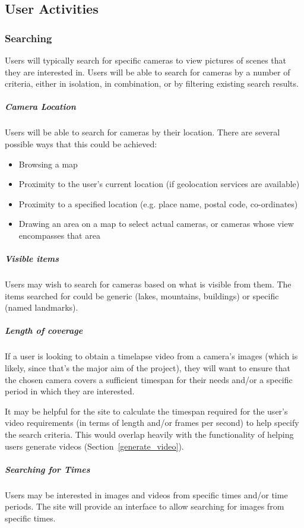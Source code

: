 \documentclass[11pt]{article}
\begin{document}
\subsection{User Activities}
\subsubsection{Searching}
Users will typically search for specific cameras to view pictures of scenes that they are interested in. Users will be able to search for cameras by a number of criteria, either in isolation, in combination, or by filtering existing search results.

\subparagraph{Camera Location}
Users will be able to search for cameras by their location. There are several possible ways that this could be achieved:

\begin{itemize}
\item Browsing a map
\item Proximity to the user's current location (if geolocation services are available)
\item Proximity to a specified location (e.g. place name, postal code, co-ordinates)
\item Drawing an area on a map to select actual cameras, or cameras whose view encompasses that area
\end{itemize}

\subparagraph{Visible items}
Users may wish to search for cameras based on what is visible from them. The items searched for could be generic (lakes, mountains, buildings) or specific (named landmarks).

\subparagraph{Length of coverage}
If a user is looking to obtain a timelapse video from a camera's images (which is likely, since that's the major aim of the project), they will want to ensure that the chosen camera covers a sufficient timespan for their needs and/or a specific period in which they are interested.

It may be helpful for the site to calculate the timespan required for the user's video requirements (in terms of length and/or frames per second) to help specify the search criteria. This would overlap heavily with the functionality of helping users generate videos (Section~\ref{generate_video}).

\subparagraph{Searching for Times}
Users may be interested in images and videos from specific times and/or time periods. The site will provide an interface to allow searching for images from specific times.
\end{document}
